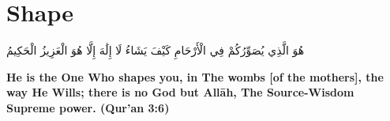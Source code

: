 \chapter{Shape}
\begin{center}
    {\Huge    
        \begin{Arabic}
            هُوَ الَّذِي يُصَوِّرُكُمْ فِي الْأَرْحَامِ كَيْفَ يَشَاءُ لَا إِلَٰهَ إِلَّا هُوَ الْعَزِيزُ الْحَكِيمُ
        \end{Arabic}
    }    
\end{center}
\vspace*{\fill}
\vspace{3cm}
\begin{center}
    \large \textbf{He is the One Who shapes you, in The wombs [of the mothers], the way He Wills; there is no God but Allāh, The Source-Wisdom Supreme power. (Qur'an 3:6)}
\end{center}

